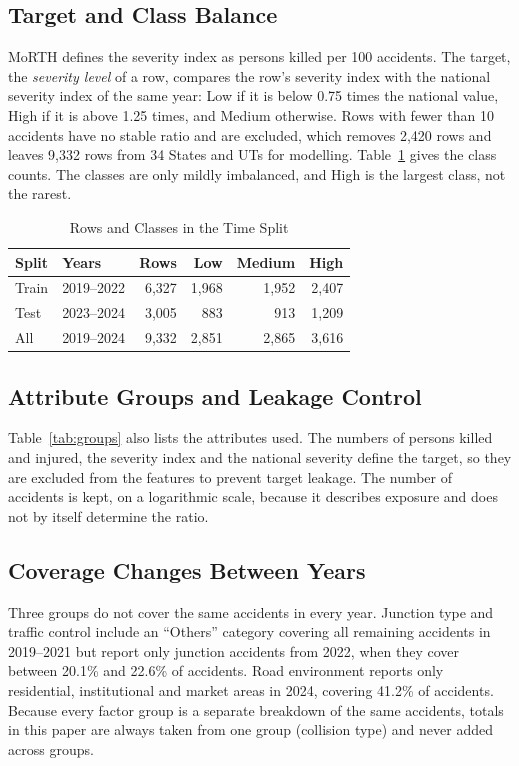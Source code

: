 \documentclass[conference]{IEEEtran}
\begin{document}
\subsection{Target and Class Balance}
MoRTH defines the severity index as persons killed per 100 accidents. The target, the \emph{severity level} of a row, compares the row's severity index with the national severity index of the same year: Low if it is below 0.75 times the national value, High if it is above 1.25 times, and Medium otherwise. Rows with fewer than 10 accidents have no stable ratio and are excluded, which removes 2,420 rows and leaves 9,332 rows from 34 States and UTs for modelling. Table~\ref{tab:split} gives the class counts. The classes are only mildly imbalanced, and High is the largest class, not the rarest.

\begin{table}[t]
\caption{Rows and Classes in the Time Split}
\label{tab:split}
\centering
\footnotesize
\begin{tabular}{@{}llrrrr@{}}
\toprule
Split & Years & Rows & Low & Medium & High \\
\midrule
Train & 2019--2022 & 6,327 & 1,968 & 1,952 & 2,407 \\
Test & 2023--2024 & 3,005 & 883 & 913 & 1,209 \\
\midrule
All & 2019--2024 & 9,332 & 2,851 & 2,865 & 3,616 \\
\bottomrule
\end{tabular}
\end{table}

\subsection{Attribute Groups and Leakage Control}
Table~\ref{tab:groups} also lists the attributes used. The numbers of persons killed and injured, the severity index and the national severity define the target, so they are excluded from the features to prevent target leakage. The number of accidents is kept, on a logarithmic scale, because it describes exposure and does not by itself determine the ratio.

\subsection{Coverage Changes Between Years}
Three groups do not cover the same accidents in every year. Junction type and traffic control include an ``Others'' category covering all remaining accidents in 2019--2021 but report only junction accidents from 2022, when they cover between 20.1\% and 22.6\% of accidents. Road environment reports only residential, institutional and market areas in 2024, covering 41.2\% of accidents. Because every factor group is a separate breakdown of the same accidents, totals in this paper are always taken from one group (collision type) and never added across groups.
\end{document}
